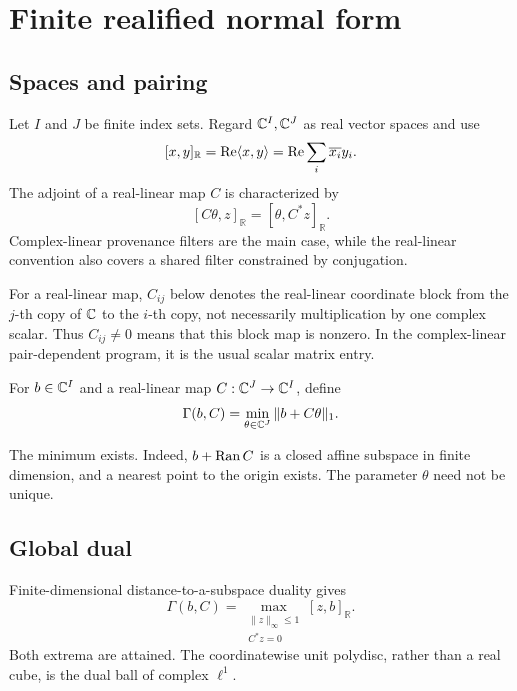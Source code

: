 \section{Finite realified normal form}
\label{sec:normal-form}

\subsection{Spaces and pairing}

Let \(I\) and \(J\) be finite index sets. Regard
\(\mathbb C^I,\mathbb C^J\) as real vector spaces and use
\[
 [x,y]_{\mathbb R}
 =
 \operatorname{Re}\langle x,y\rangle
 =
 \operatorname{Re}\sum_i\overline{x_i}y_i.
\]
The adjoint of a real-linear map \(C\) is characterized by
\[
 [C\theta,z]_{\mathbb R}
 =
 [\theta,C^*z]_{\mathbb R}.
\]
Complex-linear provenance filters are the main case, while the
real-linear convention also covers a shared filter constrained by
conjugation.

For a real-linear map, \(C_{ij}\) below denotes the real-linear
coordinate block from the \(j\)-th copy of \(\mathbb C\) to the \(i\)-th copy,
not necessarily multiplication by one complex scalar. Thus
\(C_{ij}\ne0\) means that this block map is nonzero. In the
complex-linear pair-dependent program, it is the usual scalar matrix
entry.

\begin{definition}
\label{def:Gamma}
For \(b\in\mathbb C^I\) and a real-linear map
\(C:\mathbb C^J\to\mathbb C^I\), define
\[
 \Gamma(b,C)
 =
 \min_{\theta\in\mathbb C^J}\|b+C\theta\|_1.
\]
\end{definition}

The minimum exists. Indeed, \(b+\operatorname{Ran} C\) is a closed affine subspace in
finite dimension, and a nearest point to the origin exists. The
parameter \(\theta\) need not be unique.

\subsection{Global dual}

Finite-dimensional distance-to-a-subspace duality
\citep[Section 15]{Rockafellar1970} gives
\begin{equation}
 \Gamma(b,C)
 =
 \max_{\substack{\|z\|_\infty\le1\\C^*z=0}}
 [z,b]_{\mathbb R}.
 \label{eq:global-dual}
\end{equation}
Both extrema are attained. The coordinatewise unit polydisc, rather
than a real cube, is the dual ball of complex \(\ell^1\).

